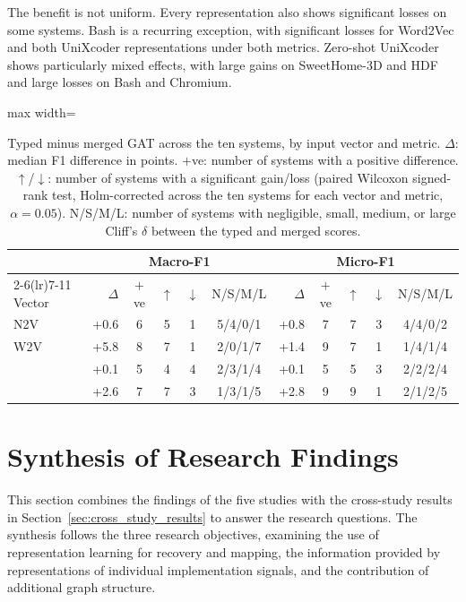 The benefit is not uniform. Every representation also shows significant losses on some systems. Bash is a recurring exception, with significant losses for Word2Vec and both UniXcoder representations under both metrics. Zero-shot UniXcoder shows particularly mixed effects, with large gains on SweetHome-3D and HDF and large losses on Bash and Chromium.

\begin{table}[!htb]
\centering
\caption[Typed versus merged GAT across file representations.]{Typed minus merged GAT across the ten systems, by input vector and metric. $\Delta$: median F1 difference in points. $+$ve: number of systems with a positive difference. $\uparrow$/$\downarrow$: number of systems with a significant gain/loss (paired Wilcoxon signed-rank test, Holm-corrected across the ten systems for each vector and metric, $\alpha=0.05$). N/S/M/L: number of systems with negligible, small, medium, or large Cliff's $\delta$ between the typed and merged scores.}
\label{tab:gat_typed_summary}
\begin{adjustbox}{max width=\linewidth}
\renewcommand{\arraystretch}{1.1}
\begin{tabular}{l rcccc rcccc}
\toprule
& \multicolumn{5}{c}{Macro-F1}
& \multicolumn{5}{c}{Micro-F1} \\
\cmidrule(lr){2-6}\cmidrule(lr){7-11}
Vector
& $\Delta$ & $+$ve & $\uparrow$ & $\downarrow$ & N/S/M/L
& $\Delta$ & $+$ve & $\uparrow$ & $\downarrow$ & N/S/M/L \\
\midrule
N2V   & +0.6 & 6 & 5 & 1 & 5/4/0/1 & +0.8 & 7 & 7 & 3 & 4/4/0/2 \\
W2V   & +5.8 & 8 & 7 & 1 & 2/0/1/7 & +1.4 & 9 & 7 & 1 & 1/4/1/4 \\
\zs{} & +0.1 & 5 & 4 & 4 & 2/3/1/4 & +0.1 & 5 & 5 & 3 & 2/2/2/4 \\
\ft{} & +2.6 & 7 & 7 & 3 & 1/3/1/5 & +2.8 & 9 & 9 & 1 & 2/1/2/5 \\
\bottomrule
\end{tabular}
\end{adjustbox}
\end{table}
% 
\section{Synthesis of Research Findings \label{sec:contributions}}

This section combines the findings of the five studies with the cross-study results in Section~\ref{sec:cross_study_results} to answer the research questions. The synthesis follows the three research objectives, examining the use of representation learning for recovery and mapping, the information provided by representations of individual implementation signals, and the contribution of additional graph structure.

